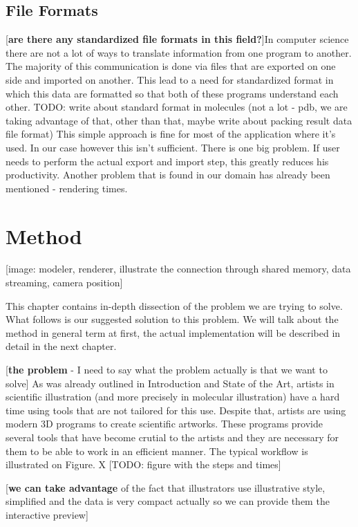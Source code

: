 \documentclass[
  digital, %
  table,   %
  nolof,     %
  nolot,     %
]{fithesis3}
\begin{document}
\section{File Formats}

[\textbf{are there any standardized file formats in this field?}]In computer science there are not a lot of ways to translate information from one program to another. The majority of this communication is done via files that are exported on one side and imported on another. This lead to a need for standardized format in which this data are formatted so that both of these programs understand each other. TODO: write about standard format in molecules (not a lot - pdb, we are taking advantage of that, other than that, maybe write about packing result data file format) This simple approach is fine for most of the application where it's used. In our case however this isn't sufficient. There is one big problem. If user needs to perform the actual export and import step, this greatly reduces his productivity. Another problem that is found in our domain has already been mentioned - rendering times.

\chapter{Method}
[image: modeler, renderer, illustrate the connection through shared memory, data streaming, camera position]

This chapter contains in-depth dissection of the problem we are trying to solve. What follows is our suggested solution to this problem. We will talk about the method in general term at first, the actual implementation will be described in detail in the next chapter.

[\textbf{the problem} - I need to say what the problem actually is that we want to solve]
As was already outlined in Introduction and State of the Art, artists in scientific illustration (and more precisely in molecular illustration) have a hard time using tools that are not tailored for this use. Despite that, artists are using modern 3D programs to create scientific artworks. These programs provide several tools that have become crutial to the artists and they are necessary for them to be able to work in an efficient manner. The typical workflow is illustrated on Figure. X [TODO: figure with the steps and times]

[\textbf{we can take advantage} of the fact that illustrators use illustrative style, simplified and the data is very compact actually so we can provide them the interactive preview]
\end{document}
